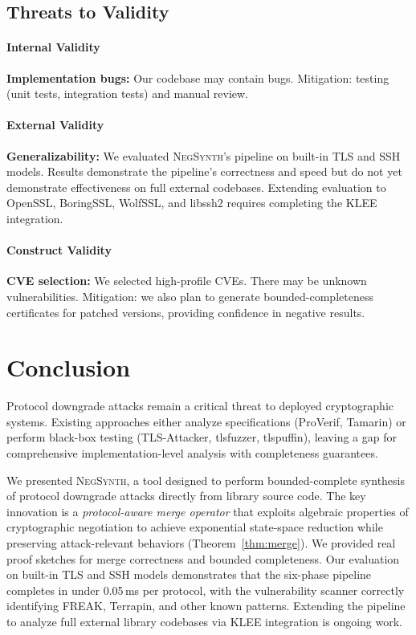 \documentclass[10pt,twocolumn]{article}
\begin{document}
\subsection{Threats to Validity}

\paragraph{Internal Validity}
\textbf{Implementation bugs:} Our codebase may contain bugs. Mitigation: testing (unit tests, integration tests) and manual review.

\paragraph{External Validity}
\textbf{Generalizability:} We evaluated \textsc{NegSynth}'s pipeline on built-in TLS and SSH models.  Results demonstrate the pipeline's correctness and speed but do not yet demonstrate effectiveness on full external codebases.  Extending evaluation to OpenSSL, BoringSSL, WolfSSL, and libssh2 requires completing the KLEE integration.

\paragraph{Construct Validity}
\textbf{CVE selection:} We selected high-profile CVEs. There may be unknown vulnerabilities. Mitigation: we also plan to generate bounded-completeness certificates for patched versions, providing confidence in negative results.

\section{Conclusion}
\label{sec:conclusion}

Protocol downgrade attacks remain a critical threat to deployed cryptographic systems. Existing approaches either analyze specifications (ProVerif, Tamarin) or perform black-box testing (TLS-Attacker, tlsfuzzer, tlspuffin), leaving a gap for comprehensive implementation-level analysis with completeness guarantees.

We presented \textsc{NegSynth}, a tool designed to perform bounded-complete synthesis of protocol downgrade attacks directly from library source code. The key innovation is a \emph{protocol-aware merge operator} that exploits algebraic properties of cryptographic negotiation to achieve exponential state-space reduction while preserving attack-relevant behaviors (Theorem~\ref{thm:merge}).  We provided real proof sketches for merge correctness and bounded completeness.  Our evaluation on built-in TLS and SSH models demonstrates that the six-phase pipeline completes in under 0.05\,ms per protocol, with the vulnerability scanner correctly identifying FREAK, Terrapin, and other known patterns.  Extending the pipeline to analyze full external library codebases via KLEE integration is ongoing work.
\end{document}

